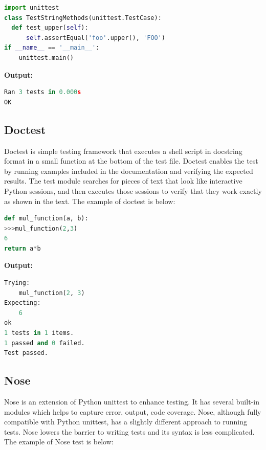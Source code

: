 \documentclass[10pt]{ruthesis}
\begin{document}

\begin{lstlisting}[language=Python]
import unittest
class TestStringMethods(unittest.TestCase):
  def test_upper(self):
      self.assertEqual('foo'.upper(), 'FOO')
if __name__ == '__main__':
    unittest.main()
\end{lstlisting}

\textbf{Output:}

\begin{lstlisting}[language=Python]
Ran 3 tests in 0.000s
OK
\end{lstlisting}

\subsection{Doctest}
Doctest is simple testing framework that executes a shell script in docstring format in a small function at the bottom of the test file. Doctest enables the test by running examples included in the documentation and verifying the expected results. The test module searches for pieces of text that look like interactive Python sessions, and then executes those sessions to verify that they work exactly as shown in the text. The example of doctest is below:

\begin{lstlisting}[language=Python]
def mul_function(a, b):
>>>mul_function(2,3)
6
return a*b
\end{lstlisting}

\textbf{Output:}

\begin{lstlisting}[language=Python]
Trying:
    mul_function(2, 3)
Expecting:
    6
ok
1 tests in 1 items.
1 passed and 0 failed.
Test passed.
\end{lstlisting}


\subsection{Nose}
Nose is an extension of Python unittest to enhance testing. It has several built-in modules which helps to capture error, output, code coverage. Nose, although fully compatible with Python unittest, has a slightly different approach to running tests. Nose lowers the barrier to writing tests and its syntax is less complicated.
The example of Nose test is below:
\end{document}
